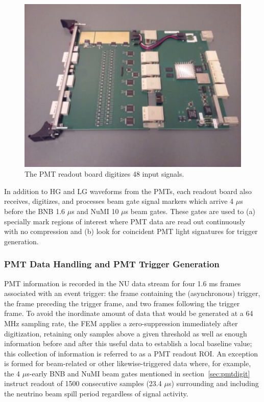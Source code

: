 \begin{figure}
\centering
\includegraphics[width=0.8\linewidth]{./figures/PMTshaper.pdf}%
\caption{\label{fig:readout_8}The PMT readout board digitizes 48 input signals.}
\end{figure}

In addition to HG and LG waveforms from the PMTs, each readout board also receives, digitizes, and processes beam gate signal markers which arrive 4 $\mu$s before the BNB 1.6 $\mu$s and NuMI 10 $\mu$s beam gates. These gates are used to (a) specially mark regions of interest where PMT data are read out continuously with no compression and (b) look for coincident PMT light signatures for trigger generation. 

\subsubsection{PMT Data Handling and PMT Trigger Generation}
\label{tpcfem}

PMT information is recorded in the NU data stream for four 1.6 ms frames associated with an event trigger: the frame containing the (asynchronous) trigger, the frame preceding the trigger frame, and two frames following the trigger frame. To avoid the inordinate amount of data that would be generated at a 64 MHz sampling rate, the FEM applies a zero-suppression immediately after digitization, retaining only samples above a given threshold as well as enough information before and after this useful data to establish a local baseline value; this collection of information is referred to as a PMT readout ROI. An exception is formed for beam-related or other likewise-triggered data where, for example,  the 4 $\mu$s-early BNB and NuMI beam gates mentioned in section~\ref{sec:pmtdigit} instruct readout of 1500 consecutive samples (23.4 $\mu$s) surrounding and including the neutrino beam spill period regardless of signal activity.

